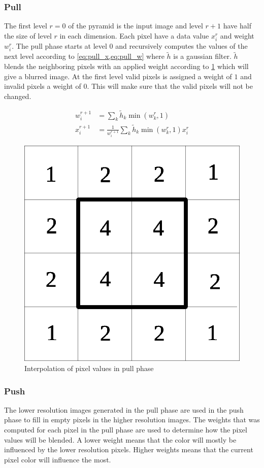 \subsubsection{Pull}
The first level $r = 0$ of the pyramid is the input image and level $r + 1$ have half the size of level $r$ in each dimension. Each pixel have a data value $x^r_i$ and weight $w^r_i$. The pull phase starts at level 0 and recursively computes the values of the next level according to \cref{eq:pull_x,eq:pull_w} where $\tilde{h}$ is a gaussian filter. $\tilde{h}$ blends the neighboring pixels with an applied weight according to \cref{fig:pull_filter} which will give a blurred image. At the first level valid pixels is assigned a weight of $1$ and invalid pixels a weight of $0$. This will make sure that the valid pixels will not be changed.

\begin{align}
  w^{r+1}_i &= \sum_k {\tilde{h}_k \min(w^r_k,1)} \label{eq:pull_x}\\
  x^{r+1}_i &= \frac{1}{w^{r+1}_i} \sum_k {\tilde{h}_k \min(w^r_k,1) x^r_i} \label{eq:pull_w}
\end{align}



\begin{figure}[h]
    \centering
    \includegraphics[width=.3\textwidth]{figures/pull_filter.eps}
    \caption{Interpolation of pixel values in pull phase}
    \label{fig:pull_filter}
\end{figure}


\subsubsection{Push}
The lower resolution images generated in the pull phase are used in the push phase to fill in empty pixels in the higher resolution images. The weights that was computed for each pixel in the pull phase are used to determine how the pixel values will be blended. A lower weight means that the color will mostly be influenced by the lower resolution pixels. Higher weights means that the current pixel color will influence the most.

